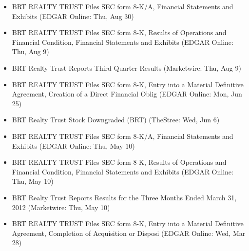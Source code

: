 \documentclass[11pt,asymmetric]{article}
\begin{document}
\begin{itemize}
\item BRT REALTY TRUST Files SEC form 8-K/A, Financial Statements and Exhibits (EDGAR Online: Thu, Aug 30)
\item BRT REALTY TRUST Files SEC form 8-K, Results of Operations and Financial Condition, Financial Statements and Exhibits (EDGAR Online: Thu, Aug 9)
\item BRT Realty Trust Reports Third Quarter Results (Marketwire: Thu, Aug 9)
\item BRT REALTY TRUST Files SEC form 8-K, Entry into a Material Definitive Agreement, Creation of a Direct Financial Oblig (EDGAR Online: Mon, Jun 25)
\item BRT Realty Trust Stock Downgraded (BRT) (TheStree: Wed, Jun 6)
\item BRT REALTY TRUST Files SEC form 8-K/A, Financial Statements and Exhibits (EDGAR Online: Thu, May 10)
\item BRT REALTY TRUST Files SEC form 8-K, Results of Operations and Financial Condition, Financial Statements and Exhibits (EDGAR Online: Thu, May 10)
\item BRT Realty Trust Reports Results for the Three Months Ended March 31, 2012 (Marketwire: Thu, May 10)
\item BRT REALTY TRUST Files SEC form 8-K, Entry into a Material Definitive Agreement, Completion of Acquisition or Disposi (EDGAR Online: Wed, Mar 28)
\end{itemize}
\end{document}
